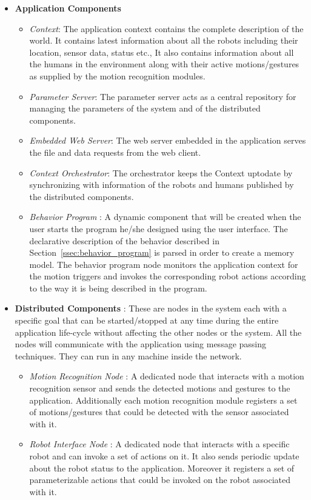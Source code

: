 \documentclass{llncs}
\begin{document}
\begin{itemize}
\item \textbf{Application Components}
\begin{itemize}
\item \emph{Context}: The application context contains the complete description of the world. It contains latest information about all the robots including their location, sensor data, status etc., It also contains information about all the humans in the environment along with their active motions/gestures as supplied by the motion recognition modules.
\item \emph{Parameter Server}: The parameter server acts as a central repository for managing the parameters of the system and of the distributed components.
\item \emph{Embedded Web Server}: The web server embedded in the application serves the file and data requests from the web client.
\item \emph{Context Orchestrator}: The orchestrator keeps the Context uptodate by synchronizing with information of the robots and humans published by the distributed components.
\item \emph{Behavior Program} : A dynamic component that will be created when the user starts the program he/she designed using the user interface. The declarative description of the behavior described in Section~\ref{ssec:behavior_program} is parsed in order to create a memory model. The behavior program node monitors the application context for the motion triggers and invokes the corresponding robot actions according to the way it is being described in the program.
\end{itemize}
\item \textbf{Distributed Components} : These are nodes in the system each with a specific goal that can be started/stopped at any time during the entire application life-cycle without affecting the other nodes or the system. All the nodes will communicate with the application using message passing techniques. They can run in any machine inside the network.
\begin{itemize}
\item \emph{Motion Recognition Node} : A dedicated node that interacts with a motion recognition sensor and sends the detected motions and gestures to the application. Additionally each motion recognition module registers a set of motions/gestures that could be detected with the sensor associated with it.
\item \emph{Robot Interface Node} : A dedicated node that interacts with a specific robot and can invoke a set of actions on it. It also sends periodic update about the robot status to the application. Moreover it registers a set of parameterizable actions that could be invoked on the robot associated with it.

\end{itemize}
\end{itemize}
\end{document}
